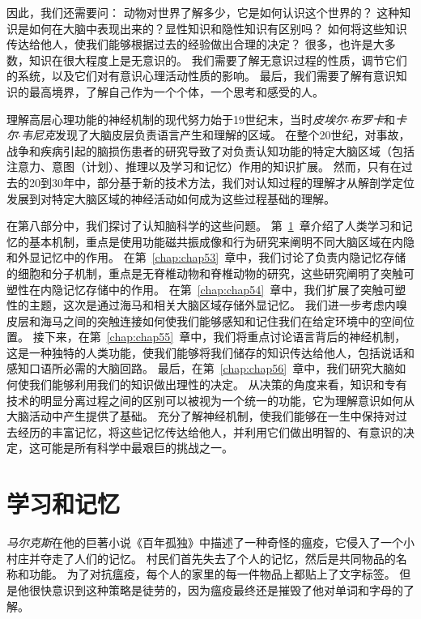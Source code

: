 因此，我们还需要问：
动物对世界了解多少，它是如何认识这个世界的？
这种知识是如何在大脑中表现出来的？显性知识和隐性知识有区别吗？
如何将这些知识传达给他人，使我们能够根据过去的经验做出合理的决定？
很多，也许是大多数，知识在很大程度上是无意识的。
我们需要了解无意识过程的性质，调节它们的系统，以及它们对有意识心理活动性质的影响。
最后，我们需要了解有意识知识的最高境界，了解自己作为一个个体，一个思考和感受的人。


理解高层心理功能的神经机制的现代努力始于19世纪末，当时\textit{皮埃尔$\cdot$布罗卡}和\textit{卡尔$\cdot$韦尼克}发现了大脑皮层负责语言产生和理解的区域。
在整个20世纪，对事故，战争和疾病引起的脑损伤患者的研究导致了对负责认知功能的特定大脑区域（包括注意力、意图（计划）、推理以及学习和记忆）作用的知识扩展。
然而，只有在过去的20到30年中，部分基于新的技术方法，我们对认知过程的理解才从解剖学定位发展到对特定大脑区域的神经活动如何成为这些过程基础的理解。


在第八部分中，我们探讨了认知脑科学的这些问题。
第~\ref{chap:chap52}~章介绍了人类学习和记忆的基本机制，重点是使用功能磁共振成像和行为研究来阐明不同大脑区域在内隐和外显记忆中的作用。
在第~\ref{chap:chap53}~章中，我们讨论了负责内隐记忆存储的细胞和分子机制，重点是无脊椎动物和脊椎动物的研究，这些研究阐明了突触可塑性在内隐记忆存储中的作用。
在第~\ref{chap:chap54}~章中，我们扩展了突触可塑性的主题，这次是通过海马和相关大脑区域存储外显记忆。
我们进一步考虑内嗅皮层和海马之间的突触连接如何使我们能够感知和记住我们在给定环境中的空间位置。
接下来，在第~\ref{chap:chap55}~章中，我们将重点讨论语言背后的神经机制，这是一种独特的人类功能，使我们能够将我们储存的知识传达给他人，包括说话和感知口语所必需的大脑回路。
最后，在第~\ref{chap:chap56}~章中，我们研究大脑如何使我们能够利用我们的知识做出理性的决定。
从决策的角度来看，知识和专有技术的明显分离过程之间的区别可以被视为一个统一的功能，它为理解意识如何从大脑活动中产生提供了基础。
充分了解神经机制，使我们能够在一生中保持对过去经历的丰富记忆，将这些记忆传达给他人，并利用它们做出明智的、有意识的决定，这可能是所有科学中最艰巨的挑战之一。



\chapter{学习和记忆} \label{chap:chap52}

\textit{马尔克斯}在他的巨著小说《百年孤独》中描述了一种奇怪的瘟疫，它侵入了一个小村庄并夺走了人们的记忆。
村民们首先失去了个人的记忆，然后是共同物品的名称和功能。
为了对抗瘟疫，每个人的家里的每一件物品上都贴上了文字标签。
但是他很快意识到这种策略是徒劳的，因为瘟疫最终还是摧毁了他对单词和字母的了解。


